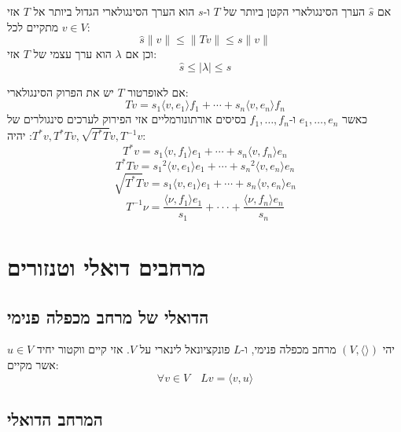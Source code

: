 \documentclass{tstextbook}
\begin{document}
\begin{proposition}
אם \(\hat{s}\) הערך הסינגולארי הקטן ביותר של \(T\) ו-\(s\) הוא הערך הסינגולארי הגדול ביותר אל \(T\) אזי מתקיים לכל \(v \in V\):
$$\hat{s}\lVert v \rVert \leq \lVert Tv \rVert \leq s\lVert v \rVert $$
וכן אם \(\lambda\) הוא ערך עצמי של \(T\) אזי:
$$\hat{s}\leq \left\lvert  \lambda  \right\rvert \leq s$$

\end{proposition}
\begin{proposition}
אם לאופרטור \(T\) יש את הפרוק הסינגולארי:
$$T v=s_{1}\langle v,e_{1}\rangle f_{1}+\cdots+s_{n}\langle v,e_{n}\rangle f_{n}$$
כאשר \(e_{1},\dots,e_{n}\) ו-\(f_{1},\dots,f_{n}\) בסיסים אורתונורמליים אזי הפירוק לערכים סינגולרים של \(T^{*}v,T^{*}Tv,\sqrt{ T^{*}T }v,T^{-1}v\): יהיה:
$$T^{*}v=s_{1}\langle v,f_{1}\rangle e_{1}+\cdots+s_{n}\langle v,f_{n}\rangle e_{n}$$$$T^{*}T v={s_{1}}^{2}\langle v,e_{1}\rangle e_{1}+\cdots+{s_{n}}^{2}\langle v,e_{n}\rangle e_{n}$$$${\sqrt{T^{*}T}}v=s_{1}\langle v,e_{1}\rangle e_{1}+\cdots+s_{n}\langle v,e_{n}\rangle e_{n}$$$$T^{-1}\nu=\frac{\langle\nu,f_{1}\rangle e_{1}}{s_{1}}+\cdot\cdot\cdot+\frac{\langle\nu,f_{n}\rangle e_{n}}{s_{n}}$$

\end{proposition}
\section{מרחבים דואלי וטנזורים}

\subsection{הדואלי של מרחב מכפלה פנימי}

\begin{theorem}
יהי \(\left( V,\langle  \rangle \right)\) מרחב מכפלה פנימי, ו-\(L\) פונקציונאל לינארי על \(V\). אזי קיים ווקטור יחיד \(u \in V\) אשר מקיים:
$$\forall v \in V\quad Lv = \langle v,u \rangle $$

\end{theorem}
\subsection{המרחב הדואלי}
\end{document}

